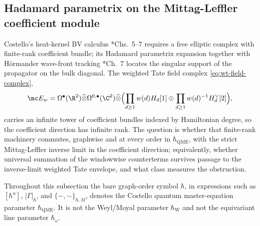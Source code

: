 \subsection*{Hadamard parametrix on the Mittag-Leffler coefficient module}

Costello's heat-kernel BV calculus
\cite{costello-renormalization}*{Chs.~5--7} requires a free elliptic
complex with finite-rank coefficient bundle; its Hadamard parametrix
expansion together with Hörmander wave-front tracking
\cite{hormander-vol1}*{Ch.~7} locates the singular support of the
propagator on the bulk diagonal.  The weighted Tate field complex
\eqref{eq:wt-field-complex},
\[
  \mc E_w
    =
  \Omega^\bullet(\R^2)\widehat\otimes
    \Omega^{0,\bullet}(\C^2)\widehat\otimes
  \Bigl(
    \prod_{d\geq1}w(d)H_d[1]
    \oplus\prod_{d\geq1}w(d)^{-1}H_d^\vee[2]
  \Bigr),
\]
carries an infinite tower of coefficient bundles indexed by Hamiltonian
degree, so the coefficient direction has infinite rank.  The question
is whether that finite-rank machinery commutes, graphwise and at every
order in \(\hbar_{\mathrm{QME}}\), with the strict Mittag-Leffler
inverse limit in the coefficient direction; equivalently, whether
universal summation of the windowwise counterterms survives passage to
the inverse-limit weighted Tate envelope, and what class measures the
obstruction.

Throughout this subsection the bare graph-order symbol \(\hbar\), in
expressions such as \([\hbar^n]\), \(|\Gamma|_\hbar\), and
\(\{ -,-\}_{\hbar,M}\), denotes the Costello quantum master-equation
parameter \(\hbar_{\mathrm{QME}}\).  It is not the Weyl/Moyal parameter
\(\hbar_{\mathrm{W}}\) and not the equivariant line parameter
\(\hbar_\omega\).

